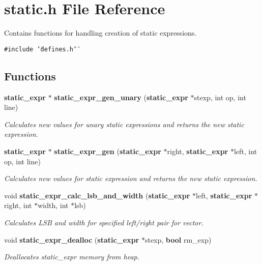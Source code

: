 \section{static.h File Reference}
\label{static_8h}
Contains functions for handling creation of static expressions. 


{\tt \#include \char`\"{}defines.h\char`\"{}}\par
\subsection*{Functions}
\begin{CompactItemize}
\item 
{\bf static\_\-expr} $\ast$ {\bf static\_\-expr\_\-gen\_\-unary} ({\bf static\_\-expr} $\ast$stexp, int op, int line)
\begin{CompactList}\small\item\em Calculates new values for unary static expressions and returns the new static expression.\item\end{CompactList}\item 
{\bf static\_\-expr} $\ast$ {\bf static\_\-expr\_\-gen} ({\bf static\_\-expr} $\ast$right, {\bf static\_\-expr} $\ast$left, int op, int line)
\begin{CompactList}\small\item\em Calculates new values for static expression and returns the new static expression.\item\end{CompactList}\item 
void {\bf static\_\-expr\_\-calc\_\-lsb\_\-and\_\-width} ({\bf static\_\-expr} $\ast$left, {\bf static\_\-expr} $\ast$right, int $\ast$width, int $\ast$lsb)
\begin{CompactList}\small\item\em Calculates LSB and width for specified left/right pair for vector.\item\end{CompactList}\item 
void {\bf static\_\-expr\_\-dealloc} ({\bf static\_\-expr} $\ast$stexp, {\bf bool} rm\_\-exp)
\begin{CompactList}\small\item\em Deallocates static\_\-expr memory from heap.\item\end{CompactList}\end{CompactItemize}


